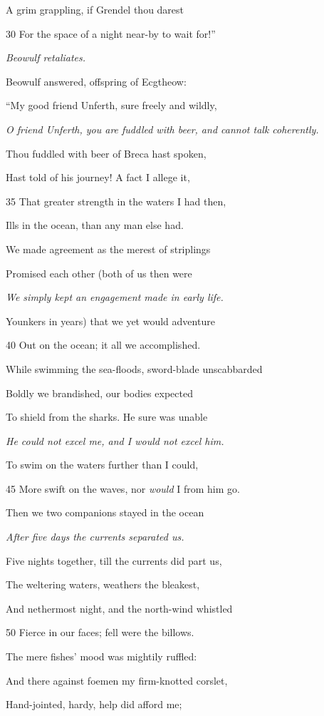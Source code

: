 A grim grappling, if Grendel thou darest

30
For the space of a night near-by to wait for!”

\emph{Beowulf retaliates.}

Beowulf answered, offspring of Ecgtheow:

“My good friend Unferth, sure freely and wildly,

\emph{O friend Unferth,
you are fuddled
with beer, and cannot
talk coherently.}

Thou fuddled with beer of Breca hast spoken,

Hast told of his journey! A fact I allege it,

35
That greater strength in the waters I had then,

Ills in the ocean, than any man else had.

We made agreement as the merest of striplings

Promised each other (both of us then were

\emph{We simply kept an
engagement made
in early life.}

Younkers in years) that we yet would adventure

40
Out on the ocean; it all we accomplished.

While swimming the sea-floods, sword-blade unscabbarded

Boldly we brandished, our bodies expected

To shield from the sharks. He sure was unable

\emph{He \emph{could} not excel
me, and I \emph{would}
not excel him.}

To swim on the waters further than I could,

45
More swift on the waves, nor \emph{would} I from him go.

Then we two companions stayed in the ocean

\emph{After five days the
currents separated
us.}

Five nights together, till the currents did part us,

The weltering waters, weathers the bleakest,

And nethermost night, and the north-wind whistled

50
Fierce in our faces; fell were the billows.

The mere fishes’ mood was mightily ruffled:

And there against foemen my firm-knotted corslet,

Hand-jointed, hardy, help did afford me;

